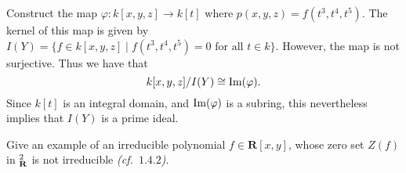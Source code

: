 \documentclass{hw_pset} %
\DeclareMathOperator{\im}{\rm{Im}}    %
\let\aa\relax
\DeclareMathOperator{\aa}{\mathbf{A}} %
\renewcommand{\phi}{\varphi}
\begin{document}
\begin{solution}
    Construct the map $\phi: k[x,y,z] \to k[t]$ where $p(x,y,z) = f(t^3, t^4, t^5)$. 
    The kernel of this map is given by $I(Y) = \{f \in k[x,y,z] \mid f(t^3, t^4, t^5) = 0 \text{ for all } t \in k  \}$.
    However, the map is not surjective. 
    Thus we have that 
    \[
        k[x,y,z]/I(Y) \cong \im(\phi).
    \]
    Since $k[t]$ is an integral domain, and $\im(\phi)$ is a subring, 
    this nevertheless implies that $I(Y)$ is a prime ideal.
\end{solution}

\begin{exercise}[1.12]
    Give an example of an irreducible polynomial $f \in \mathbf{R}[x,y]$,
    whose zero set $Z(f)$ in $\aa_{\mathbf{R}}^2$ is not irreducible
    \emph{(cf.~$1.4.2$)}.
\end{exercise}

\begin{solution}

\end{solution}
\end{document}
